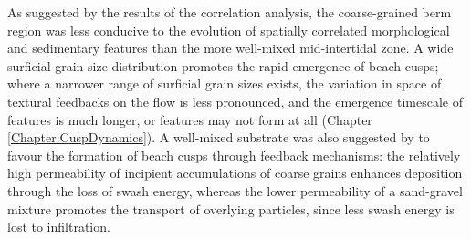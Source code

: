 As suggested by the results of the correlation analysis, the coarse-grained berm region was less conducive to the evolution of spatially correlated morphological and sedimentary features than the more well-mixed mid-intertidal zone. A wide surficial grain size distribution promotes the rapid emergence of beach cusps; where a narrower range of surficial grain sizes exists, the variation in space of textural feedbacks on the flow is less pronounced, and the emergence timescale of features is much longer, or features may not form at all (Chapter \ref{Chapter:CuspDynamics}). A well-mixed substrate was also suggested by \citet{LonguetHiggins_Parkin1962} to favour the formation of beach cusps through feedback mechanisms: the relatively high permeability of incipient accumulations of coarse grains enhances deposition through the loss of swash energy, whereas the lower permeability of a sand-gravel mixture promotes the transport of overlying particles, since less swash energy is lost to infiltration. 




